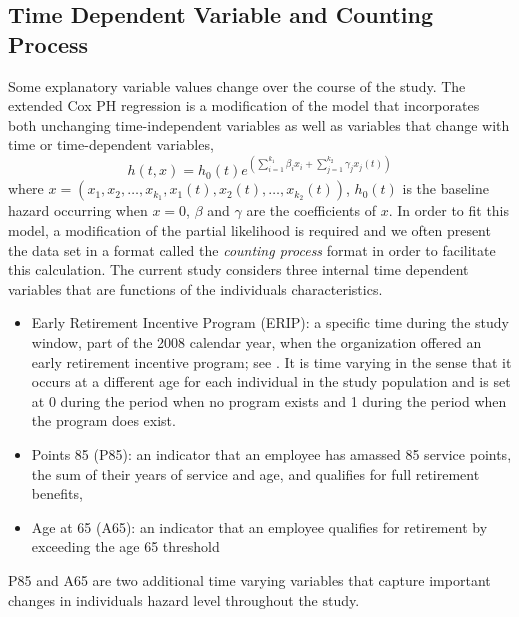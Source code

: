 \documentclass[12pt,letterpaper]{article}
\begin{document}
\subsection{Time Dependent Variable and Counting Process}
\label{sec:coxt}
Some explanatory variable values change over the course of the study. The extended Cox PH regression is a modification of the model that incorporates both unchanging time-independent variables as well as variables that change with time or time-dependent variables,
\begin{equation}
	\label{eq:timecovar}
	h(t,x)=h_0(t)e^{(\sum_{i=1}^{k_1}\beta_ix_i+\sum_{j=1}^{k_2}\gamma_jx_j(t))}
\end{equation}
where $x=(x_1, x_2, \ldots, x_{k_1}, x_1(t), x_2(t), \ldots, x_{k_2}(t))$, $h_0(t)$ is the baseline hazard occurring when $x=0$, $\beta$ and $\gamma$ are the coefficients of $x$. In order to fit this model, a modification of the partial likelihood is required and we often present the data set in a format called the {\it counting process} format in order to facilitate this calculation. The current study considers three internal time dependent variables that are functions of the individuals characteristics.
\begin{itemize}
\item Early Retirement Incentive Program (ERIP): a specific time during the study window, part of the 2008 calendar year, when the organization offered an early retirement incentive program; see \citep{ERIP}. It is time varying in the sense that it occurs at a different age for each individual in the study population and is set at 0 during the period when no program exists and 1 during the period when the program does exist.
\item Points 85 (P85): an indicator that an employee has amassed 85 service points, the sum of their years of service and age, and qualifies for full retirement benefits,
\item Age at 65 (A65): an indicator that an employee qualifies for retirement by exceeding the age 65 threshold
\end{itemize}
P85 and A65 are two additional time varying variables that capture important changes in individuals hazard level throughout the study.

\end{document}
